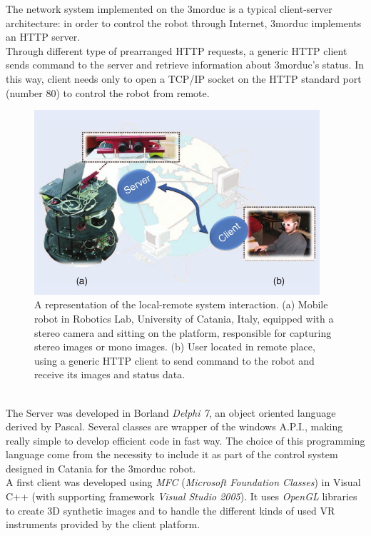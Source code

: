 The network system implemented on the 3morduc is a typical
client-server architecture: in order to control the robot through
Internet, 3morduc implements an HTTP server.
\\
Through different type of prearranged HTTP requests, a generic
HTTP client sends command to the server and retrieve information
about 3morduc's status. In this way, client needs only to open a TCP/IP
socket on the HTTP standard port (number 80) to control the robot from
remote.
\begin{figure}[h]
  \begin{center}
    \includegraphics[width=300pt]{img/3morduc_client_server.png}
    \caption{A representation of the local-remote system
      interaction. (a) Mobile robot in Robotics Lab, University of
      Catania, Italy, equipped with a stereo camera and sitting on
      the platform, responsible for capturing stereo images or mono
      images. (b) User located in remote place, using a generic HTTP
      client to send command to the robot and receive its images
      and status data.
    }
    \label{fig:3morduc_client_server}
    \end{center}
\end{figure}
\\
The Server was developed in Borland \textit{Delphi 7}, an object oriented
language
derived by Pascal. Several classes are wrapper of the windows A.P.I., making
really simple to develop efficient code in fast way. The choice of this
programming language come from the necessity to include it as part of the
control system designed in Catania for the 3morduc robot.
\\
A first client was developed using \textit{MFC} (\textit{Microsoft Foundation
Classes}) in Visual C++ (with supporting framework \textit{Visual Studio 2005}).
It uses \textit{OpenGL} libraries to create 3D synthetic images and to handle
the different kinds of used VR instruments provided by the client platform.
